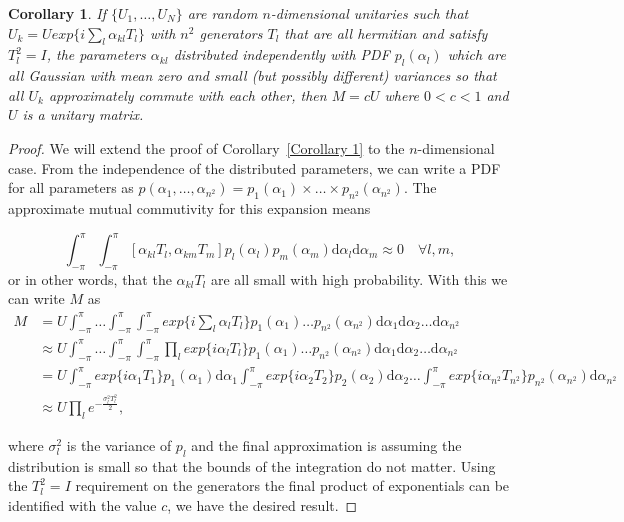 \documentclass[aps,pra,twocolumn,superscriptaddress,numerical,floatfix]{revtex4-1}
\newtheorem{corollary}{Corollary}
\begin{document}
\begin{corollary}
\label{Corollary 2}
If $\{U_1,\ldots,U_N\}$ are random $n$-dimensional unitaries such that $U_k = U exp\{i \sum_l \alpha_{kl} T_l\}$ with $n^2$ generators $T_l$ that are all hermitian and satisfy $T_l^2=I$, the parameters $\alpha_{kl}$ distributed independently with PDF $p_{l}(\alpha_l)$ which are all Gaussian with mean zero and small (but possibly different) variances so that all $U_k$ approximately commute with each other, then $M = c U$ where $0 < c < 1$ and $U$ is a unitary matrix.
\end{corollary}
\begin{proof}
We will extend the proof of Corollary~\ref{Corollary 1} to the $n$-dimensional case.  From the independence of the distributed parameters, we can write a PDF for all parameters as $p(\alpha_1,\ldots,\alpha_{n^{2}}) = p_1(\alpha_1)\times\ldots\times p_{n^2}(\alpha_{n^{2}})$.  
The approximate mutual commutivity for this expansion means 
\begin{widetext}
\newcommand{\theint}{\int^\pi_{-\pi} \ldots \int^\pi_{-\pi} \int^\pi_{-\pi}}
\newcommand{\theintd}{\mathrm{d}\alpha_1 \mathrm{d}\alpha_2 \ldots \mathrm{d}\alpha_{n^{2}}}
\begin{equation}
	\int^\pi_{-\pi} \int^\pi_{-\pi}
	[\alpha_{kl}T_{l},\alpha_{km}T_{m}] p_l(\alpha_l)p_m(\alpha_m) \mathrm{d}\alpha_l \mathrm{d}\alpha_m \approx 0 \quad \forall l,m,
\end{equation}
or in other words, that the $\alpha_{kl}T_l$ are all small with high probability.  With this we can write $M$ as
\begin{align}
	M &= U \theint
	exp\{i \sum_l \alpha_{l} T_l\} p_1(\alpha_1)\ldots p_{n^2}(\alpha_{n^{2}})
	\theintd
	\label{eq:general integral form} \\
	&\approx U \theint
	\prod_{l}exp\{i \alpha_{l} T_l\}p_1(\alpha_1)\ldots p_{n^2}(\alpha_{n^{2}})
	\theintd  \\
	&= U\int^\pi_{-\pi} exp\{i \alpha_{1} T_1\}p_1(\alpha_1) \mathrm{d}\alpha_1 	\int^\pi_{-\pi} exp\{i \alpha_{2} T_2\}p_2(\alpha_2) \mathrm{d}\alpha_2 \ldots \int^\pi_{-\pi}
	exp\{i \alpha_{n^2} T_{n^2}\}p_{n^2}(\alpha_{n^2}) \mathrm{d}\alpha_{n^2} \\
	&\approx U \prod_l e^{-\frac{\sigma_l^2 T_l^2}{2}},\label{eq:approx commuting, general case}
\end{align}
\end{widetext}
where $\sigma_l^2$ is the variance of $p_l$ and the final approximation is assuming the distribution is small so that the bounds of the integration do not matter.  Using the $T_l^2=I$ requirement on the generators the final product of exponentials can be identified with the value $c$, we have the desired result.
\end{proof}
\end{document}
